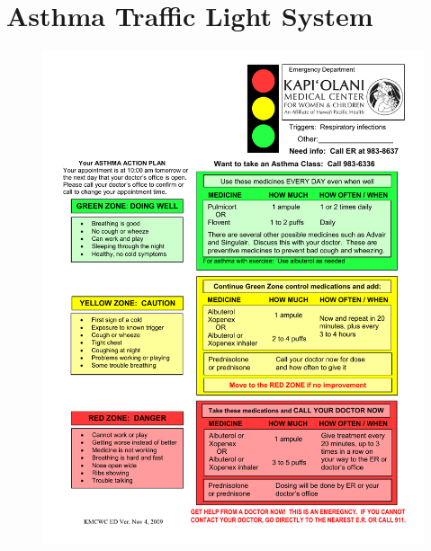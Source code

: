 \chapter{Asthma Traffic Light System}
\label{chp:traffic-light}
\begin{figure}[htp]
	\centering
	\includegraphics[scale=0.50]{Appendices/KapiolaniEDAsthmaActionPlan.pdf}
\end{figure}